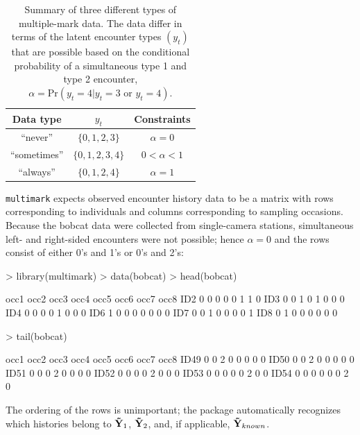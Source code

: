 \documentclass[12pt]{article}
\begin{document}
\begin{table}
  \caption{\label{tab:datatypes} Summary of three different types of multiple-mark data. The data differ in terms of the latent encounter types $(y_t)$ that are possible based on the conditional probability of a simultaneous type 1 and type 2 encounter, $\alpha = \text{Pr}\left( y_t=4|y_t=3 \text{ or } y_t=4 \right)$.}
  \begin{tabular}{c|cc}
  \hline 
  Data type & $y_t$ &  Constraints \tabularnewline
  \hline 
  ``never'' & $\{0,1,2,3\}$ & $\alpha=0$ \tabularnewline
  ``sometimes'' & $\{0,1,2,3,4\}$ & $0<\alpha<1$ \tabularnewline
  ``always'' & $\{0,1,2,4\}$ & $\alpha=1$ \tabularnewline
  \hline 
  \end{tabular}
\end{table}

\verb|multimark| expects observed encounter history data to be a matrix with rows corresponding to individuals and columns corresponding to sampling occasions. Because the bobcat data were collected from single-camera stations, simultaneous left- and right-sided encounters were not possible; hence $\alpha=0$ and the rows consist of either 0's and 1's or 0's and 2's:
\begin{Schunk}
\begin{Sinput}
> library(multimark)
> data(bobcat)
> head(bobcat)
\end{Sinput}
\begin{Soutput}
    occ1 occ2 occ3 occ4 occ5 occ6 occ7 occ8
ID2    0    0    0    0    0    1    1    0
ID3    0    0    1    0    1    0    0    0
ID4    0    0    0    0    1    0    0    0
ID6    1    0    0    0    0    0    0    0
ID7    0    0    1    0    0    0    0    1
ID8    0    1    0    0    0    0    0    0
\end{Soutput}
\begin{Sinput}
> tail(bobcat)
\end{Sinput}
\begin{Soutput}
     occ1 occ2 occ3 occ4 occ5 occ6 occ7 occ8
ID49    0    0    2    0    0    0    0    0
ID50    0    0    2    0    0    0    0    0
ID51    0    0    0    2    0    0    0    0
ID52    0    0    0    0    2    0    0    0
ID53    0    0    0    0    0    2    0    0
ID54    0    0    0    0    0    0    2    0
\end{Soutput}
\end{Schunk}
The ordering of the rows is unimportant; the package automatically recognizes which histories belong to ${\bf {\tilde Y}}_1$, ${\bf {\tilde Y}}_2$, and, if applicable, ${\bf {\tilde Y}}_{known}$.
\end{document}
